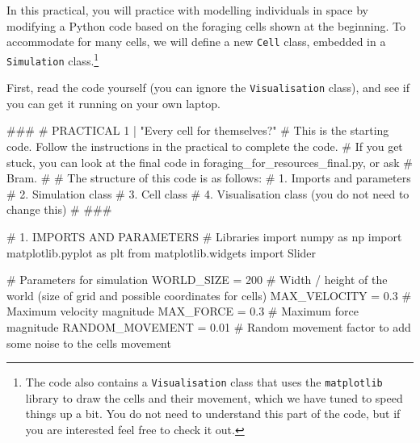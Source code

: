 \documentclass[
  letterpaper,
  DIV=11,
  numbers=noendperiod]{scrreprt}
\newenvironment{Shaded}{\begin{snugshade}}{\end{snugshade}}
\newcommand{\CommentTok}[1]{\textcolor[rgb]{0.37,0.37,0.37}{#1}}
\newcommand{\DecValTok}[1]{\textcolor[rgb]{0.68,0.00,0.00}{#1}}
\newcommand{\FloatTok}[1]{\textcolor[rgb]{0.68,0.00,0.00}{#1}}
\newcommand{\ImportTok}[1]{\textcolor[rgb]{0.00,0.46,0.62}{#1}}
\newcommand{\NormalTok}[1]{\textcolor[rgb]{0.00,0.23,0.31}{#1}}
\newcommand{\OperatorTok}[1]{\textcolor[rgb]{0.37,0.37,0.37}{#1}}
\theoremstyle{definition}
\theoremstyle{remark}
\begin{document}

In this practical, you will practice with modelling individuals in space
by modifying a Python code based on the foraging cells shown at the
beginning. To accommodate for many cells, we will define a new
\texttt{Cell} class, embedded in a \texttt{Simulation} class.\footnote{The
  code also contains a \texttt{Visualisation} class that uses the
  \texttt{matplotlib} library to draw the cells and their movement,
  which we have tuned to speed things up a bit. You do not need to
  understand this part of the code, but if you are interested feel free
  to check it out.}

First, read the code yourself (you can ignore the \texttt{Visualisation}
class), and see if you can get it running on your own laptop.

\begin{tcolorbox}[enhanced jigsaw, left=2mm, opacitybacktitle=0.6, toptitle=1mm, colbacktitle=quarto-callout-note-color!10!white, toprule=.15mm, coltitle=black, colframe=quarto-callout-note-color-frame, opacityback=0, title=\textcolor{quarto-callout-note-color}{\faInfo}\hspace{0.5em}{STARTING CODE FOR ``moving cells''}, breakable, bottomtitle=1mm, rightrule=.15mm, titlerule=0mm, arc=.35mm, leftrule=.75mm, bottomrule=.15mm, colback=white]

\begin{Shaded}
\begin{Highlighting}[]
\CommentTok{\#\#\#}
\CommentTok{\# PRACTICAL 1 | "Every cell for themselves?"}
\CommentTok{\# This is the starting code. Follow the instructions in the practical to complete the code. }
\CommentTok{\# If you get stuck, you can look at the final code in \textasciigrave{}foraging\_for\_resources\_final.py\textasciigrave{}, or ask}
\CommentTok{\# Bram. }
\CommentTok{\#}
\CommentTok{\# The structure of this code is as follows:}
\CommentTok{\# 1. Imports and parameters}
\CommentTok{\# 2. Simulation class}
\CommentTok{\# 3. Cell class}
\CommentTok{\# 4. Visualisation class (you do not need to change this)}
\CommentTok{\#}
\CommentTok{\#\#\#}

\CommentTok{\# 1. IMPORTS AND PARAMETERS}
\CommentTok{\# Libraries}
\ImportTok{import}\NormalTok{ numpy }\ImportTok{as}\NormalTok{ np}
\ImportTok{import}\NormalTok{ matplotlib.pyplot }\ImportTok{as}\NormalTok{ plt}
\ImportTok{from}\NormalTok{ matplotlib.widgets }\ImportTok{import}\NormalTok{ Slider}

\CommentTok{\# Parameters for simulation}
\NormalTok{WORLD\_SIZE }\OperatorTok{=} \DecValTok{200}    \CommentTok{\# Width / height of the world (size of grid and possible coordinates for cells)}
\NormalTok{MAX\_VELOCITY }\OperatorTok{=} \FloatTok{0.3}  \CommentTok{\# Maximum velocity magnitude}
\NormalTok{MAX\_FORCE }\OperatorTok{=} \FloatTok{0.3}     \CommentTok{\# Maximum force magnitude}
\NormalTok{RANDOM\_MOVEMENT  }\OperatorTok{=} \FloatTok{0.01} \CommentTok{\# Random movement factor to add some noise to the cell\textquotesingle{}s movement}


\end{Highlighting}
\end{Shaded}
\end{tcolorbox}
\end{document}
